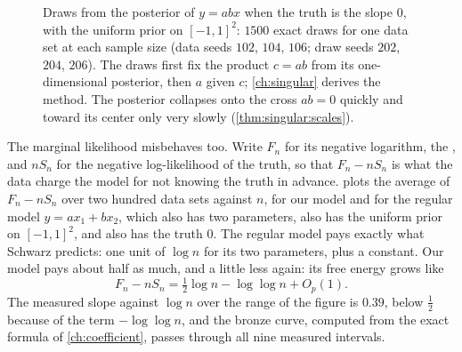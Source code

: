 \begin{refsection}
\begin{figure}[t]
\centering
{}
\caption{Draws from the posterior of $y=abx$ when the truth is the slope $0$, with the uniform prior on $[-1,1]^2$: $1500$ exact draws for one data set at each sample size (data seeds $102$, $104$, $106$; draw seeds $202$, $204$, $206$). The draws first fix the product $c=ab$ from its one-dimensional posterior, then $a$ given $c$; \cref{ch:singular} derives the method. The posterior collapses onto the cross $ab=0$ quickly and toward its center only very slowly (\cref{thm:singular:scales}).}\label{fig:prologue:draws}
\end{figure}

The marginal likelihood misbehaves too. Write $F_n$ for its negative logarithm, the , and $nS_n$ for the negative log-likelihood of the truth, so that $F_n-nS_n$ is what the data charge the model for not knowing the truth in advance.  plots the average of $F_n-nS_n$ over two hundred data sets against $n$, for our model and for the regular model $y=ax_1+bx_2$, which also has two parameters, also has the uniform prior on $[-1,1]^2$, and also has the truth $0$. The regular model pays exactly what Schwarz predicts: one unit of $\log n$ for its two parameters, plus a constant. Our model pays about half as much, and a little less again: its free energy grows like
\begin{equation}\label{eq:prologue:free}
F_n-nS_n=\tfrac12\log n-\log\log n+O_p(1).
\end{equation}
The measured slope against $\log n$ over the range of the figure is $0.39$, below $\tfrac12$ because of the term $-\log\log n$, and the bronze curve, computed from the exact formula of \cref{ch:coefficient}, passes through all nine measured intervals.


\end{refsection}
